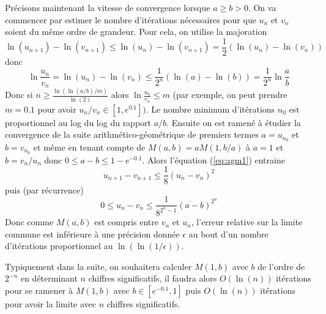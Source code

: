 \documentclass[a4paper,11pt]{article}
\begin{document}
Précisons maintenant la vitesse de convergence lorsque $a \geq b>0$. 
On va commencer par estimer le nombre
d'itérations nécessaires pour que $u_n$ et $v_n$ soient du même ordre de grandeur.
Pour cela, on utilise la majoration
\[ \ln(u_{n+1})-\ln(v_{n+1}) \leq \ln(u_{n})-\ln(v_{n+1}) = \frac{1}{2}
(\ln(u_{n})-\ln(v_{n})) \]
donc
\[ \ln \frac{u_n}{v_n} = \ln(u_n)-\ln(v_n) \leq 
\frac{1}{2^n} (\ln(a)-\ln(b)) = \frac{1}{2^n} \ln \frac{a}{b} \]
Donc si $n \geq \frac{\ln( \ln(a/b)/m)}{\ln(2)}$ alors
$\ln \frac{u_n}{v_n} \leq m$ (par exemple, on peut prendre $m=0.1$ pour 
avoir $u_n/v_n \in [1,e^{0.1}])$. Le nombre minimum d'itérations $n_0$ est proportionnel
au log du log du rapport $a/b$.
Ensuite on est ramené à étudier la convergence de la suite arithmético-géométrique
de premiers termes $a=u_{n_0}$ et $b=v_{n_0}$ et même en tenant compte
de $M(a,b)=aM(1,b/a)$ à $a=1$ et $b=v_n/u_n$ donc $0\leq a-b \leq 1-e^{-0.1}$.
Alors l'équation (\ref{eq:agm1}) entraine 
\[ u_{n+1}-v_{n+1} \leq \frac{1}{8}(u_n-v_n)^2 \]
puis (par récurrence)
\[ 0 \leq u_n-v_n \leq \frac{1}{8^{2^n-1}}(a-b)^{2^n} \]
Donc comme $M(a,b)$ est compris entre $v_n$ et $u_n$, l'erreur relative sur la limite
commune est inférieure à une précision donnée $\epsilon$
au bout d'un nombre d'itérations proportionnel au $\ln(\ln(1/\epsilon))$.

Typiquement dans la suite, on souhaitera calculer $M(1,b)$ avec $b$ de l'ordre
de $2^{-n}$ en déterminant $n$ chiffres significatifs,
il faudra alors $O(\ln(n))$ itérations pour se ramener à $M(1,b)$ avec $b\in [e^{-0.1},1]$ 
puis $O(\ln(n))$ itérations pour avoir la limite avec $n$ chiffres significatifs.
\end{document}
